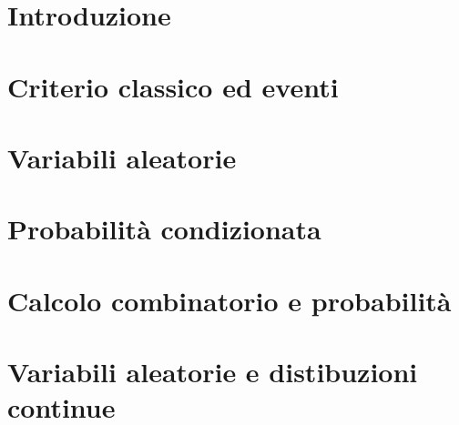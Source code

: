 \documentclass[12pt]{article}
\begin{document}


\tableofcontents
\restoregeometry

\section{Introduzione}


\section{Criterio classico ed eventi}


\section{Variabili aleatorie}


\section{Probabilità condizionata}


\section{Calcolo combinatorio e probabilità}


\section{Variabili aleatorie e distibuzioni continue}

\end{document}
